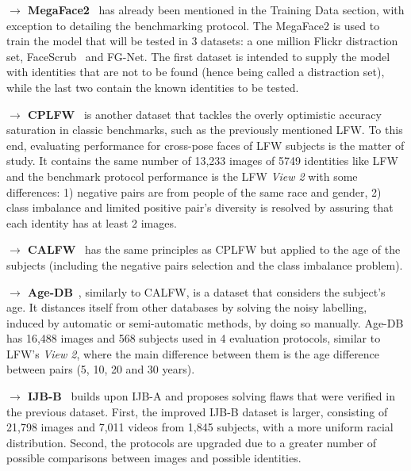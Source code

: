 \documentclass[class=report, crop=false, a4paper, 12pt]{standalone}
\begin{document}
\vspace{0.7\baselineskip}
\noindent\textbf{$\rightarrow$ MegaFace2}~\autocite{nechLevelPlayingField2017} has already been mentioned in the Training Data section, with exception to detailing the benchmarking protocol. The MegaFace2 is used to train the model that will be tested in 3 datasets: a one million Flickr distraction set, FaceScrub~\autocite{ngDatadrivenApproachCleaning2014} and FG-Net. The first dataset is intended to supply the model with identities that are not to be found (hence being called a distraction set), while the last two contain the known identities to be tested.

\vspace{0.7\baselineskip}
\noindent\textbf{$\rightarrow$ CPLFW}~\autocite{zhengCrossPoseLFWDatabase} is another dataset that tackles the overly optimistic accuracy saturation in classic benchmarks, such as the previously mentioned LFW. To this end, evaluating performance for cross-pose faces of LFW subjects is the matter of study. It contains the same number of 13,233 images of 5749 identities like LFW and the benchmark protocol performance is the LFW \textit{View 2} with some differences: 1) negative pairs are from people of the same race and gender, 2) class imbalance and limited positive pair's diversity is resolved by assuring that each identity has at least 2 images.

\vspace{0.7\baselineskip}
\noindent\textbf{$\rightarrow$ CALFW}~\autocite{zhengCrossAgeLFWDatabase2017} has the same principles as CPLFW but applied to the age of the subjects (including the negative pairs selection and the class imbalance problem).

\vspace{0.7\baselineskip}
\noindent\textbf{$\rightarrow$ Age-DB}~\autocite{moschoglouAgeDBFirstManually2017}, similarly to CALFW, is a dataset that considers the subject's age. It distances itself from other databases by solving the noisy labelling, induced by automatic or semi-automatic methods, by doing so manually. Age-DB has 16,488 images and 568 subjects used in 4 evaluation protocols, similar to LFW's \textit{View 2}, where the main difference between them is the age difference between pairs (5, 10, 20 and 30 years).

\vspace{0.7\baselineskip}
\noindent\textbf{$\rightarrow$ IJB-B}~\autocite{whitelamIARPAJanusBenchmarkB2017} builds upon IJB-A and proposes solving flaws that were verified in the previous dataset. First, the improved IJB-B dataset is larger, consisting of 21,798 images and 7,011 videos from 1,845 subjects, with a more uniform racial distribution. Second, the protocols are upgraded due to a greater number of possible comparisons between images and possible identities.
\end{document}
